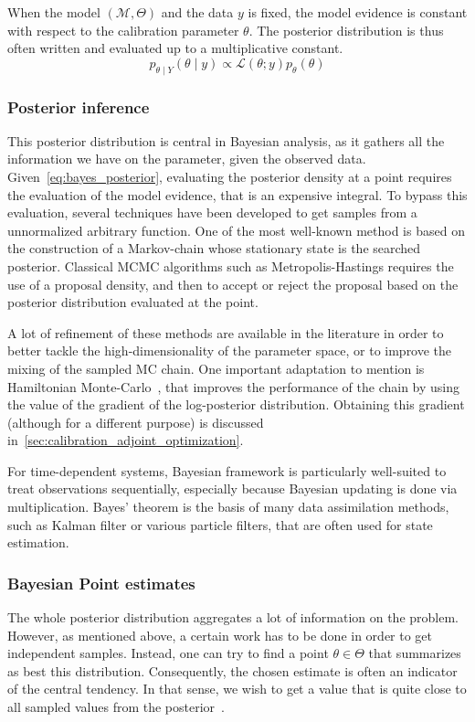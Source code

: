\documentclass[../../Main_ManuscritThese.tex]{subfiles}
\begin{document}
When the model $(\mathcal{M},\Theta)$ and the data $y$ is fixed, the model evidence is constant with respect to the calibration parameter $\theta$. The posterior distribution is thus often written and evaluated up to a multiplicative constant.
\begin{equation}
p_{\theta \mid Y}(\theta \mid y) \propto \mathcal{L}(\theta;y)p_{\theta}(\theta)
\end{equation}



\subsubsection{Posterior inference}
\label{sec:posterior_inference}
This posterior distribution is central in Bayesian analysis, as it gathers all the information we have on the parameter, given the observed data. Given~\cref{eq:bayes_posterior}, evaluating the posterior density at a point requires the evaluation of the model evidence, that is an expensive integral. To bypass this evaluation, several techniques have been developed to get samples from a unnormalized arbitrary function. One of the most well-known method is based on the construction of a Markov-chain whose stationary state is the searched posterior. Classical MCMC algorithms such as Metropolis-Hastings requires the use of a proposal density, and then to accept or reject the proposal based on the posterior distribution evaluated at the point.

A lot of refinement of these methods are available in the literature in order to better tackle the high-dimensionality of the parameter space, or to improve the mixing of the sampled MC chain. One important adaptation to mention is Hamiltonian Monte-Carlo~\cite{hanson_markov_2001,betancourt_conceptual_2017}, that improves the performance of the chain by using the value of the gradient of the log-posterior distribution. Obtaining this gradient (although for a different purpose) is discussed in~\cref{sec:calibration_adjoint_optimization}.


For time-dependent systems, Bayesian framework is particularly well-suited to treat observations sequentially, especially because Bayesian updating is done via multiplication. Bayes' theorem is the basis of many data assimilation methods, such as Kalman filter or various particle filters, that are often used for state estimation.

\subsubsection{Bayesian Point estimates}
\label{sec:bayes_point_estimates}
The whole posterior distribution aggregates a lot of information on the problem. However, as mentioned above, a certain work has to be done in order to get independent samples. Instead, one can try to find a point $\theta \in \Theta$ that summarizes as best this distribution. Consequently, the chosen estimate is often an indicator of the central tendency. In that sense, we wish to get a value that is quite close to all sampled values from the posterior~\cite{lehmann_theory_2006}.
\end{document}
